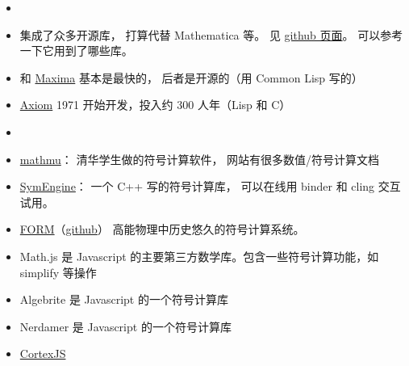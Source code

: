 
\begin{issues}
\issueDraft
\end{issues}

\begin{itemize}
\item {}
\item {} 集成了众多开源库， 打算代替 Mathematica 等。 见 \href{https://github.com/sagemath/sage/}{github 页面}。 可以参考一下它用到了哪些库。
\item  {} 和 \href{https://maxima.sourceforge.io/}{Maxima} 基本是最快的， 后者是开源的（用 Common Lisp 写的）
\item \href{http://www.axiom-developer.org/}{Axiom} 1971 开始开发，投入约 300 人年（Lisp 和 C）
\item {}
\item \href{http://mathmu.github.io/MTCAS/RecentChanges.html}{mathmu}： 清华学生做的符号计算软件， 网站有很多数值/符号计算文档
\item \href{https://github.com/symengine/symengine}{SymEngine}： 一个 C++ 写的符号计算库， 可以在线用 binder 和 cling 交互试用。
\item \href{https://www.nikhef.nl/~form/}{FORM}（\href{https://github.com/vermaseren/form}{github}） 高能物理中历史悠久的符号计算系统。
\item Math.js 是 Javascript 的主要第三方数学库。包含一些符号计算功能，如 simplify 等操作
\item Algebrite 是 Javascript 的一个符号计算库
\item Nerdamer 是 Javascript 的一个符号计算库
\item \href{https://cortexjs.io/}{CortexJS}
\end{itemize}
